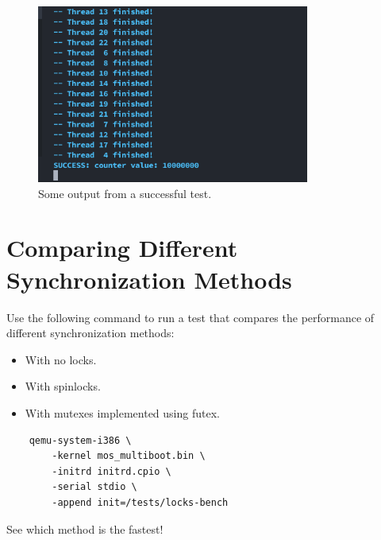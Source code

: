 \begin{figure}[h]
    \centering
    \includegraphics[width=0.8\textwidth]{assets/c3.futex-output.png}
    \caption{Some output from a successful test.}
\end{figure}

\section{Comparing Different Synchronization Methods}

Use the following command to run a test that compares the performance of different
synchronization methods:

\begin{itemize}
    \item With no locks.
    \item With spinlocks.
    \item With mutexes implemented using futex.
\end{itemize}

\begin{verbatim}
    qemu-system-i386 \
        -kernel mos_multiboot.bin \
        -initrd initrd.cpio \
        -serial stdio \
        -append init=/tests/locks-bench
\end{verbatim}

See which method is the fastest!
